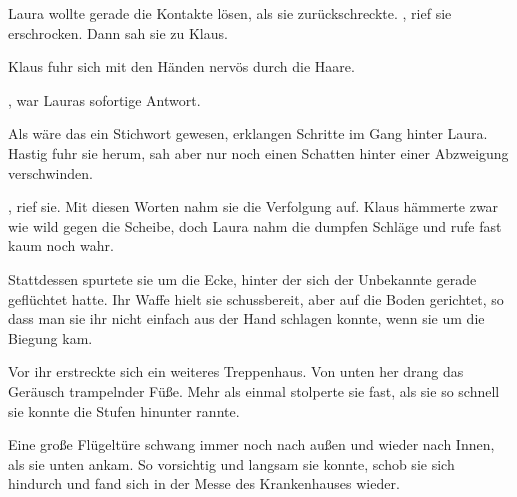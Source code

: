 \par

Laura wollte gerade die Kontakte lösen, als sie zurückschreckte. , rief sie erschrocken. Dann sah sie zu Klaus. 

\par

Klaus fuhr sich mit den Händen nervös durch die Haare. 

\par

, war Lauras sofortige Antwort. 

\par

Als wäre das ein Stichwort gewesen, erklangen Schritte im Gang hinter Laura. Hastig fuhr sie herum, sah aber nur noch einen Schatten hinter einer Abzweigung verschwinden.

\par

, rief sie.  Mit diesen Worten nahm sie die Verfolgung auf. Klaus hämmerte zwar wie wild gegen die Scheibe, doch Laura nahm die dumpfen Schläge und rufe fast kaum noch wahr.

\par

Stattdessen spurtete sie um die Ecke, hinter der sich der Unbekannte gerade geflüchtet hatte. Ihr Waffe hielt sie schussbereit, aber auf die Boden gerichtet, so dass man sie ihr nicht einfach aus der Hand schlagen konnte, wenn sie um die Biegung kam.

\par

Vor ihr erstreckte sich ein weiteres Treppenhaus. Von unten her drang das Geräusch trampelnder Füße. Mehr als einmal stolperte sie fast, als sie so schnell sie konnte die Stufen hinunter rannte.

\par

Eine große Flügeltüre schwang immer noch nach außen und wieder nach Innen, als sie unten ankam. So vorsichtig und langsam sie konnte, schob sie sich hindurch und fand sich in der Messe des Krankenhauses wieder.

